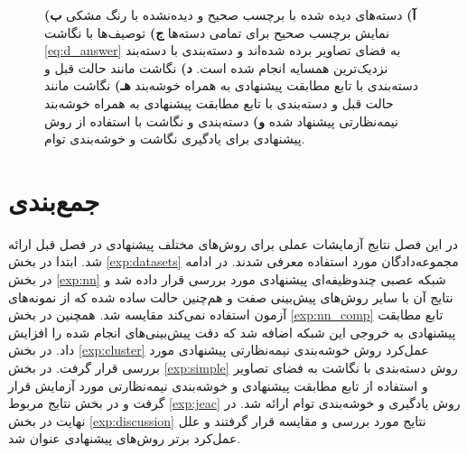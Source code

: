 \begin{figure}[t]
{  \textbf{آ)}
   دسته‌های دیده شده با برچسب صحیح و دیده‌نشده با رنگ مشکی
\textbf{ب)}
 نمایش برچسب صحیح برای تمامی دسته‌ها
  \textbf{ج)} توصیف‌ها با نگاشت \eqref{eq:d_answer}
  به فضای تصاویر برده شده‌اند و دسته‌بندی با دسته‌بند نزدیک‌ترین همسایه انجام شده است.
  \textbf{د)}
   نگاشت مانند حالت قبل و دسته‌بندی با تابع مطابقت پیشنهادی به همراه خوشه‌بند 
  \textbf{هـ)}
   نگاشت مانند حالت قبل و دسته‌بندی با تابع مطابقت پیشنهادی به همراه خوشه‌بند نیمه‌نظارتی پیشنهاد شده
  \textbf{و)}
  دسته‌بندی و نگاشت با استفاده از روش پیشنهادی برای یادگیری نگاشت و خوشه‌بندی توام.
  }
\label{fig:discussion}
\end{figure}

\section{جمع‌بندی}\label{exp:conclusion}
در این فصل نتایج آزمایشات عملی برای روش‌های مختلف پیشنهادی در فصل قبل ارائه شد. ابتدا در بخش \ref{exp:datasets} مجموعه‌دادگان مورد استفاده معرفی شدند. در ادامه
در بخش \ref{exp:nn} شبکه عصبی چندوظیفه‌ای پیشنهادی مورد بررسی قرار داده شد و نتایج آن با سایر روش‌های پیش‌بینی صفت و هم‌چنین حالت ساده شده که از نمونه‌های آزمون استفاده نمی‌کند مقایسه شد. همچنین در بخش \ref{exp:nn_comp} تابع مطابقت پیشنهادی به خروجی این شبکه اضافه شد که دقت پیش‌بینی‌های انجام شده را افزایش داد. در بخش \ref{exp:cluster} عمل‌کرد روش خوشه‌بندی نیمه‌نظارتی پیشنهادی مورد بررسی قرار گرفت. در بخش  \ref{exp:simple}  روش دسته‌بندی با نگاشت به فضای تصاویر و استفاده از تابع مطابقت پیشنهادی و خوشه‌‌بندی نیمه‌نظارتی مورد آزمایش قرار گرفت و در بخش نتایج مربوط \ref{exp:jeac} روش یادگیری و خوشه‌بندی توام ارائه شد. در نهایت در بخش \ref{exp:discussion} نتایج مورد بررسی و مقایسه قرار گرفتند و علل عمل‌کرد برتر روش‌های پیشنهادی عنوان شد.
